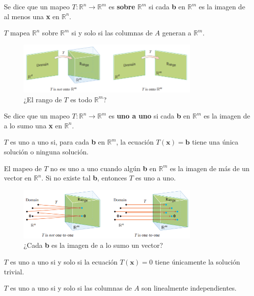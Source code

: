 \documentclass{article}
\begin{document}
Se dice que un mapeo $T: \mathbb{R}^n \rightarrow \mathbb{R}^m$ es \textbf{sobre} $\mathbb{R}^m$ si cada \textbf{b} en $\mathbb{R}^m$ es la imagen de al menos una \textbf{x} en $\mathbb{R}^n$. 

$T$ mapea $\mathbb{R}^n$ sobre $\mathbb{R}^m$ si y solo si las columnas de $A$ generan a $\mathbb{R}^m$.

\begin{figure}[ht]
    \centerline{\includegraphics[width=0.8\textwidth]{image22.png}}
    \caption{¿El rango de $T$ es todo $\mathbb{R}^m$?}
\end{figure}
  
Se dice que un mapeo $T: \mathbb{R}^n \rightarrow \mathbb{R}^m$  es \textbf{uno a uno} si cada \textbf{b} en $\mathbb{R}^m$ es la imagen de a lo sumo una \textbf{x} en $\mathbb{R}^n$.

$T$ es uno a uno si, para cada \textbf{b} en $\mathbb{R}^m$, la ecuación $T(\mathbf{x}) = \mathbf{b}$ tiene una única solución o ninguna solución.
  
El mapeo de $T$ no es uno a uno cuando algún \textbf{b} en $\mathbb{R}^m$ es la imagen de más de un vector en $\mathbb{R}^n$. Si no existe tal \textbf{b}, entonces $T$ es uno a uno.
  
\begin{figure}[ht]
    \centerline{\includegraphics[width=0.8\textwidth]{image23.png}}
    \caption{¿Cada \textbf{b} es la imagen de a lo sumo un vector?}
\end{figure}

$T$ es uno a uno si y solo si la ecuación $T(\mathbf{x}) = 0$ tiene únicamente la solución trivial. 

$T$ es uno a uno si y solo si las columnas de $A$ son linealmente independientes.
\end{document}
